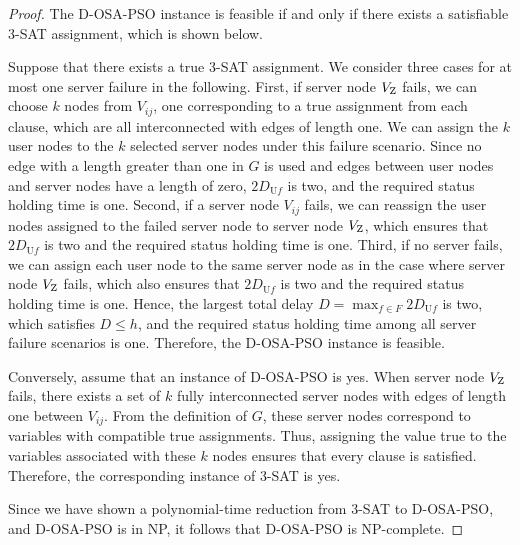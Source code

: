\documentclass[10pt, letterpaper]{IEEEtran}
\begin{document}
\begin{CJK}{UTF8}{ipxm}
\begin{proof}
  The D-OSA-PSO instance is feasible if and only if there exists a satisfiable 3-SAT assignment, which is shown below.

  Suppose that there exists a true 3-SAT assignment. 
  We consider three cases for at most one server failure in the following.
  First, if server node $V_{\rm Z}$ fails,
  we can choose $k$ nodes from $V_{ij}$, one corresponding to a true assignment from each clause, which are all interconnected with edges of length one.
  We can assign the $k$ user nodes to the $k$ selected server nodes under this failure scenario.
  Since no edge with a length greater than one in $G$ is used and edges between user nodes and server nodes have a length of zero, $2D_{\mathrm{U}f}$  is two, and the required status holding time is one.
  Second, if a server node $V_{ij}$ fails,
  we can reassign the user nodes assigned to the failed server node to server node $V_{\rm Z}$, which ensures that $2D_{\mathrm{U}f}$ is two and the required status holding time is one.
  Third, if no server fails, 
  we can assign each user node to the same server node as in the case where server node $V_{\rm Z}$ fails, which also ensures that $2D_{\mathrm{U}f}$ is two and the required status holding time is one.
  Hence, the largest total delay $D = \max_{f \in F}{2D_{\mathrm{U}f}}$ is two, which satisfies $D \leq h$, and the required status holding time among all server failure scenarios is one.
  Therefore, the D-OSA-PSO instance is feasible.

  Conversely, assume that an instance of D-OSA-PSO is yes.
  When server node $V_{\rm Z}$ fails, there exists a set of $k$ fully interconnected server nodes with edges of length one between $V_{ij}$.
  From the definition of $G$, these server nodes correspond to variables with compatible true assignments.
  Thus, assigning the value true to the variables associated with these $k$ nodes ensures that every clause is satisfied.
  Therefore, the corresponding instance of 3-SAT is yes.

  Since we have shown a polynomial-time reduction from 3-SAT to D-OSA-PSO, and D-OSA-PSO is in NP, it follows that D-OSA-PSO is NP-complete.
\end{proof}


\end{CJK}
\end{document}
